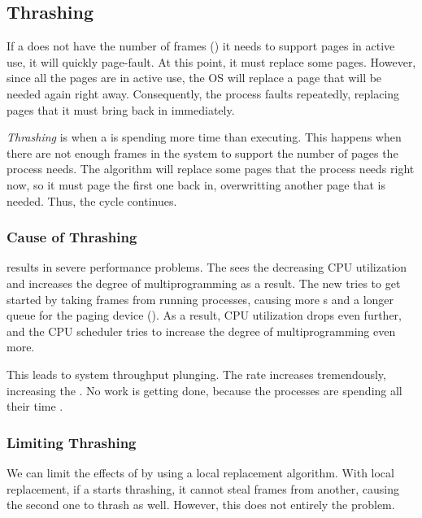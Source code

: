 \subsection{Thrashing}\label{subsec:Thrashing}
If a  does not have the number of frames () it needs to support pages in active use, it will quickly page-fault.
At this point, it must replace some pages.
However, since all the pages are in active use, the OS will replace a page that will be needed again right away.
Consequently, the process faults repeatedly, replacing pages that it must bring back in immediately.

\begin{definition}[Thrashing]\label{def:Thrashing}
  \emph{Thrashing} is when a  is spending more time  than executing.
  This happens when there are not enough frames in the system to support the number of pages the process needs.
  The  algorithm will replace some pages that the process needs right now, so it must page the first one back in, overwritting another page that is needed.
  Thus, the cycle continues.
\end{definition}

\subsubsection{Cause of Thrashing}\label{subsubsec:Thrashing_Cause}
 results in severe performance problems.
The  sees the decreasing CPU utilization and increases the degree of multiprogramming as a result.
The new  tries to get started by taking frames from running processes, causing more s and a longer queue for the paging device ().
As a result, CPU utilization drops even further, and the CPU scheduler tries to increase the degree of multiprogramming even more.

This leads to system throughput plunging.
The  rate increases tremendously, increasing the .
No work is getting done, because the processes are spending all their time .

\subsubsection{Limiting Thrashing}\label{subsubsec:Limiting_Thrashing}
We can limit the effects of  by using a local replacement algorithm.
With local replacement, if a  starts thrashing, it cannot steal frames from another, causing the second one to thrash as well.
However, this does not entirely the problem.


